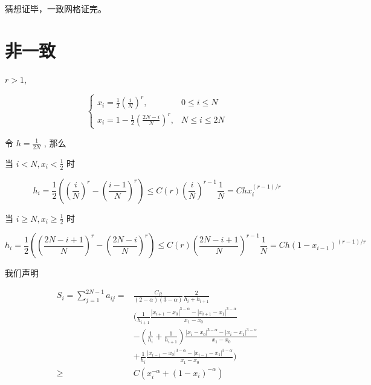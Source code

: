\documentclass{ctexart}
\begin{document}
猜想证毕，一致网格证完。


\section{非一致}

\(r > 1\), 

\begin{equation}
    \begin{cases}
        x_i = \frac{1}{2} \left(\frac{i}{N}\right)^r   , & 0 \le i \le N  \\
        x_i = 1 - \frac{1}{2} \left(\frac{2N-i}{N}\right)^r, &  N \le i \le 2N
    \end{cases}
\end{equation}

令 \(h=\frac{1}{2N}\) , 那么

当 \(i < N, x_i < \frac{1}{2}\) 时

\begin{equation}
    h_i = \frac{1}{2} \left(\left(\frac{i}{N}\right)^r - \left(\frac{i-1}{N}\right)^r\right) 
        \le C(r) \left(\frac{i}{N}\right)^{r-1} \frac{1}{N} = C h x_i^{(r-1)/r} 
\end{equation}

当 \(i \ge N, x_i \ge \frac{1}{2}\) 时

\begin{equation}
    h_i = \frac{1}{2} \left(\left(\frac{2N-i+1}{N}\right)^r - \left(\frac{2N-i}{N}\right)^r\right) 
        \le C(r) \left(\frac{2N-i+1}{N}\right)^{r-1} \frac{1}{N} = C h (1-x_{i-1})^{(r-1)/r} 
\end{equation}


我们声明

\begin{equation}
    \begin{aligned}
        S_i =\sum_{j=1}^{2N-1}a_{ij} = & \frac{C_R}{(2-\alpha)(3-\alpha)} \frac{2}{h_i + h_{i+1}} \\
        & ( \frac{1}{h_{i+1}} \frac{|x_{i+1}-x_0|^{3-\alpha} - |x_{i+1}-x_1|^{3-\alpha}}{x_1 - x_0} \\ 
        &- (\frac{1}{h_{i}}+\frac{1}{h_{i+1}})\frac{|x_{i}-x_0|^{3-\alpha} - |x_{i}-x_1|^{3-\alpha}}{x_1 - x_0}     \\ 
        &+  \frac{1}{h_{i}} \frac{|x_{i-1}-x_0|^{3-\alpha} - |x_{i-1}-x_1|^{3-\alpha}}{x_1 - x_0} )\\
        \ge & C (x_i^{-\alpha} + (1-x_i)^{-\alpha})
    \end{aligned}
\end{equation}
\end{document}
